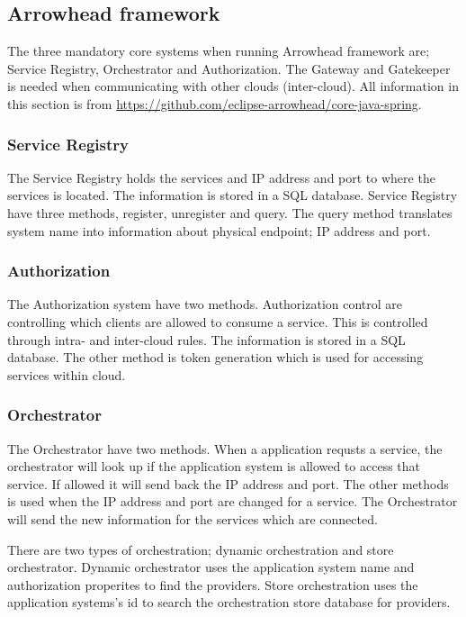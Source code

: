 \subsection{Arrowhead framework}
The three mandatory core systems when running Arrowhead framework are; Service Registry, Orchestrator and Authorization.
The Gateway and Gatekeeper is needed when communicating with other clouds (inter-cloud).
All information in this section is from \url{https://github.com/eclipse-arrowhead/core-java-spring}.

\subsubsection{Service Registry}

The Service Registry holds the services and IP address and port to where the services is located. The information is stored in a SQL database.
Service Registry have three methods, register, unregister and query. The query method translates system name into information about physical endpoint; IP address and port.

\subsubsection{Authorization}
The Authorization system have two methods.
Authorization control are controlling which clients are allowed to consume a service. This is controlled through intra- and inter-cloud rules. The information is stored in a SQL database.
The other method is token generation which is used for accessing services within cloud.

\subsubsection{Orchestrator}
The Orchestrator have two methods.
When a application requsts a service, the orchestrator will look up if the application system is allowed to access that service.
If allowed it will send back the IP address and port.
The other methods is used when the IP address and port are changed for a service.
The Orchestrator will send the new information for the services which are connected.

There are two types of orchestration; dynamic orchestration and store orchestrator.
Dynamic orchestrator uses the application system name and authorization properites to find the providers.
Store orchestration uses the application systems's id to search the orchestration store database for providers.

